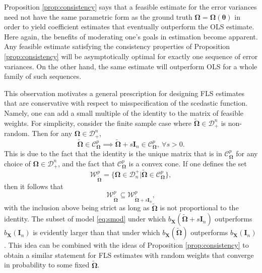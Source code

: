 \documentclass[12pt]{article}
\newcommand{\bl}[1]{{\mathbf #1}}
\newcommand{\bs}[1]{\boldsymbol #1}
\begin{document}
Proposition \ref{prop:consistency} says that a feasible estimate for the error variances need not have the same parametric form as the ground truth $\bs{\Omega} = \bs{\Omega}(\bs{\theta})$ in order to yield coefficient estimates that eventually outperform the OLS estimate. Here again, the benefits of moderating one's goals in estimation become apparent. Any feasible estimate satisfying the consistency properties of Proposition \ref{prop:consistency} will be asymptotically optimal for exactly one sequence of error variances. On the other hand, the same estimate will outperform OLS for a whole family of such sequences.

This observation motivates a general prescription for designing FLS estimates that are conservative with respect to misspecification of the scedastic function. Namely, one can add a small multiple of the identity to the matrix of feasible weights. For simplicity, consider the finite sample case where $\tilde{\bs{\Omega}} \in \mathcal{D}_+^n$ is non-random. Then for any $\bs{\Omega} \in \mathcal{D}_+^n$,
\begin{equation*}
    \tilde{\bs{\Omega}} \in \mathcal{C}^p_{\bs{\Omega}} \implies \tilde{\bs{\Omega}} + s\bl{I}_n \in \mathcal{C}^p_{\bs{\Omega}},~\forall s>0.
\end{equation*}
This is due to the fact that the identity is the unique matrix that is in $\mathcal{C}^p_{\bs{\Omega}}$ for any choice of $\bs{\Omega} \in \mathcal{D}_+^n$, and the fact that $\mathcal{C}^p_{\bs{\Omega}}$ is a convex cone.
If one defines the set
\begin{equation*}
        \mathcal{W}^p_{\tilde{\bs{\Omega}}} = \{\bs{\Omega} \in \mathcal{D}_n^+ | \tilde{\bs{\Omega}} \in \mathcal{C}^p_{\bs{\Omega}}\},
\end{equation*}
then it follows that
\begin{equation*}
    \mathcal{W}^p_{\tilde{\bs{\Omega}}} \subseteq \mathcal{W}^p_{\tilde{\bs{\Omega}} + s\bl{I}_n},
\end{equation*}
with the inclusion above being strict as long as $\tilde{\bs{\Omega}}$ is not proportional to the identity. The subset of model \eqref{eq:smod} under which $b_{\bl{X}}(\tilde{\bs{\Omega}} + s\bl{I}_n)$ outperforms $b_{\bl{X}}(\bl{I}_n)$ is evidently larger than that under which $b_{\bl{X}}(\tilde{\bs{\Omega}})$ outperforms $b_{\bl{X}}(\bl{I}_n)$. This idea can be combined with the ideas of Proposition \ref{prop:consistency} to obtain a similar statement for FLS estimates with random weights that converge in probability to some fixed $\tilde{\bs{\Omega}}$.
\end{document}
